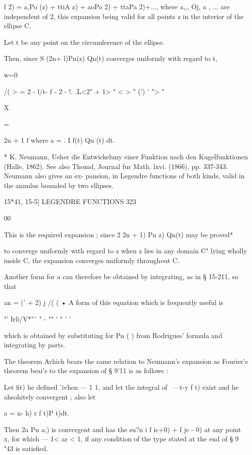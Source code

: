 {{{f 2) = a,Po (z) + ttiA z) + aoPo 2) + ttaPa 2)+..., where a,,, Oj, a ,
... are independent of 2, this expansion being valid for all points z
in the interior of the ellipse C.

Let t be any point on the circumference of the ellipse.

Then, since S (2n+ l)Pn(z) Qn(t) converges uniformly with regard to t,

w=0

/( > = 2 - l/t- f - 2 - !. .L<2" + 1> " < > " (') ' "> "

X

= %

2n + 1 f where a = . I f(t) Qn (t) dt.

* K. Neumann, Ueher die Entwickeluny einer Funktion nach den
Kugelfunktionen (Halle, 1862). See also Thomd, Journal fur Math. lxvi.
(1866), pp. 337-343. Neumann also gives an ex- pansion, in Legendre
functions of both kinds, valid in the annulus bounded by two ellipses.



15*41, 15-5] LEGENDRE FUNCTIONS 323

00

This is the required expansion ; since 2 2n + 1) Pn z) Qn(t) may be
proved*

to converge uniformly with regard to z when z lies in any domain C"
lying wholly inside C, the expansion converges uniformly throughout C.

Another form for a can therefore be obtained by integrating, as in §
15-211, so that

an = (' + 2) j /( ( • A form of this equation which is frequently
useful is



"' Irli/V*''' " - "" ' " ' '



which is obtained by substituting for Pn ( ) from Rodrigues' formula
and integrating by parts.

The theorem Avhich bears the same relation to Neumann's expansion as
Fourier's theorem beai's to the expansion of § 9'11 is as follows :

Let fit) he defined 'ivhen — 1 1, and let the integral of \ —t-y f t)
exist and he ahsohitely convergent ; also let

a = n- h) r f t)P t)dt.

Then 2a Pn a;) is convergent and has the su?n i f ic+0) + f jc - 0) at
any point x, for which — 1< ar < 1, if any condition of the type
stated at the end of § 9 "43 is satisfied.

}}}
